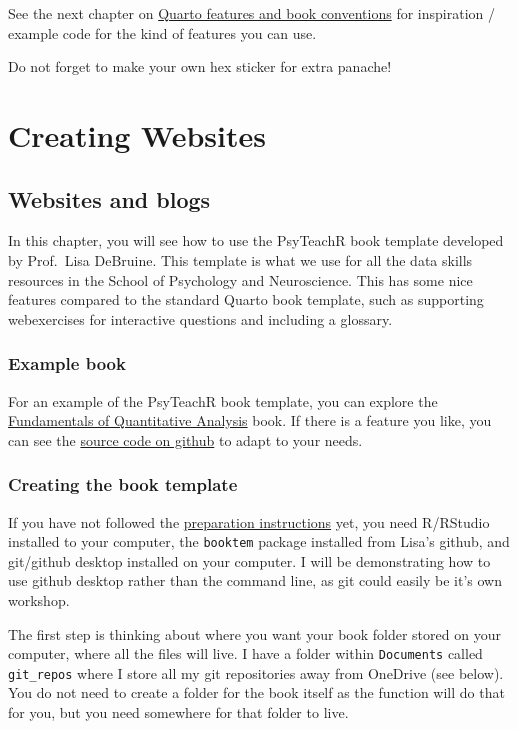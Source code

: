 \documentclass[
  letterpaper,
  DIV=11,
  numbers=noendperiod]{scrreprt}
\begin{document}
See the next chapter on \hyperref[quarto_features]{Quarto features and
book conventions} for inspiration / example code for the kind of
features you can use.

Do not forget to make your own hex sticker for extra panache!

\part{Creating Websites}

\chapter{Websites and blogs}\label{quarto_websites}

In this chapter, you will see how to use the PsyTeachR book template
developed by Prof.~Lisa DeBruine. This template is what we use for all
the data skills resources in the School of Psychology and Neuroscience.
This has some nice features compared to the standard Quarto book
template, such as supporting webexercises for interactive questions and
including a glossary.

\section{Example book}\label{example-book-1}

For an example of the PsyTeachR book template, you can explore the
\href{https://psyteachr.github.io/quant-fun-v3/}{Fundamentals of
Quantitative Analysis} book. If there is a feature you like, you can see
the \href{https://github.com/PsyTeachR/quant-fun-v3}{source code on
github} to adapt to your needs.

\section{Creating the book template}\label{creating-the-book-template-2}

If you have not followed the \hyperref[workshop_prep]{preparation
instructions} yet, you need R/RStudio installed to your computer, the
\texttt{booktem} package installed from Lisa's github, and git/github
desktop installed on your computer. I will be demonstrating how to use
github desktop rather than the command line, as git could easily be it's
own workshop.

The first step is thinking about where you want your book folder stored
on your computer, where all the files will live. I have a folder within
\texttt{Documents} called \texttt{git\_repos} where I store all my git
repositories away from OneDrive (see below). You do not need to create a
folder for the book itself as the function will do that for you, but you
need somewhere for that folder to live.
\end{document}
